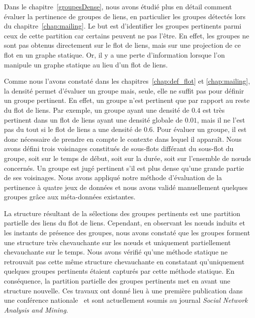 \bigskip

Dans le chapitre~\ref{groupesDense}, nous avons étudié plus en détail comment évaluer la pertinence de groupes de liens, en particulier les groupes détectés lors du chapitre~\ref{chap:mailing}.
Le but est d'identifier les groupes pertinents parmi ceux de cette partition car certains peuvent ne pas l'être.
En effet, les groupes ne sont pas obtenus directement sur le flot de liens, mais sur une projection de ce flot en un graphe statique.
Or, il y a une perte d'information lorsque l'on manipule un graphe statique au lieu d'un flot de liens.

Comme nous l'avons constaté dans les chapitres~\ref{chap:def_flot} et \ref{chap:mailing}, la densité permet d'évaluer un groupe mais, seule, elle ne suffit pas pour définir un groupe pertinent.
En effet, un groupe n'est pertinent que par rapport au reste du flot de liens.
Par exemple, un groupe ayant une densité de $0.4$ est très pertinent dans un flot de liens ayant une densité globale de $0.01$, mais il ne l'est pas du tout si le flot de liens a une densité de $0.6$.
Pour évaluer un groupe, il est donc nécessaire de prendre en compte le contexte dans lequel il apparaît.
Nous avons défini trois voisinages constitués de sous-flots différant du sous-flot du groupe, soit sur le temps de début, soit sur la durée, soit sur l'ensemble de n\oe{}uds concernés.
Un groupe est jugé pertinent s'il est plus dense qu'une grande partie de ses voisinages.
Nous avons appliqué notre méthode d'évaluation de la pertinence à quatre jeux de données et nous avons validé manuellement quelques groupes grâce aux méta-données existantes.

La structure résultant de la sélections des groupes pertinents est une partition partielle des liens du flot de liens.
Cependant, en observant les n\oe{}uds induits et les instants de présence des groupes, nous avons constaté que les groupes forment une structure très chevauchante sur les n\oe{}uds et uniquement partiellement chevauchante sur le temps.
Nous avons vérifié qu'une méthode statique ne retrouvait pas cette même structure chevauchante en constatant qu'uniquement quelques groupes pertinents étaient capturés par cette méthode statique.
En conséquence, la partition partielle des groupes pertinents  met en avant une structure nouvelle.
Ces travaux ont donné lieu à une première publication dans une conférence nationale~\cite{gaumont:hal-01305118} et sont actuellement soumis au journal \emph{Social Network Analysis and Mining}.


\bigskip

